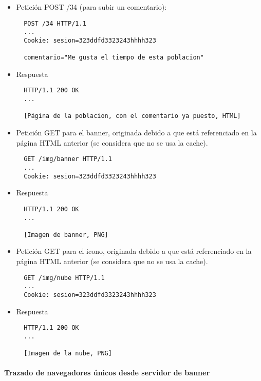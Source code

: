 \begin{itemize}
\item Petición POST /34 (para subir un comentario):

\begin{verbatim}
  POST /34 HTTP/1.1
  ...
  Cookie: sesion=323ddfd3323243hhhh323
  
  comentario="Me gusta el tiempo de esta poblacion"
\end{verbatim}

\item Respuesta

\begin{verbatim}
  HTTP/1.1 200 OK
  ...

  [Página de la poblacion, con el comentario ya puesto, HTML]
\end{verbatim}

\item Petición GET para el banner, originada debido a que está referenciado
  en la página HTML anterior (se considera que no se usa la cache).

\begin{verbatim}
  GET /img/banner HTTP/1.1
  ...
  Cookie: sesion=323ddfd3323243hhhh323
\end{verbatim}

\item Respuesta

\begin{verbatim}
  HTTP/1.1 200 OK
  ...

  [Imagen de banner, PNG]
\end{verbatim}

\item Petición GET para el icono, originada debido a que está referenciado
  en la página HTML anterior (se considera que no se usa la cache).

\begin{verbatim}
  GET /img/nube HTTP/1.1
  ...
  Cookie: sesion=323ddfd3323243hhhh323
\end{verbatim}

\item Respuesta

\begin{verbatim}
  HTTP/1.1 200 OK
  ...

  [Imagen de la nube, PNG]
\end{verbatim}


\end{itemize}


\paragraph{Trazado de navegadores únicos desde servidor de banner}

